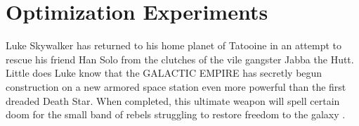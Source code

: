 \chapter{Optimization Experiments}
Luke Skywalker has returned to his home planet of Tatooine
in an attempt to rescue his friend Han Solo from the
clutches of the vile gangster Jabba the Hutt.  Little does
Luke know that the GALACTIC EMPIRE has secretly begun
construction on a new armored space station even more
powerful than the first dreaded Death Star.  When completed,
this ultimate weapon will spell certain doom for the small
band of rebels struggling to restore freedom to the galaxy \cite{bib_hutt83, bib_solo83, bib_skywalker83, bib_boba83}.

\lipsum[1-10]
